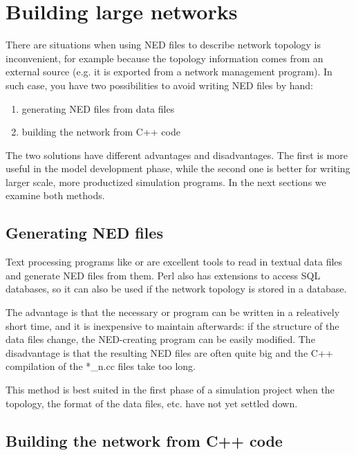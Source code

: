 \section{Building large networks}

There are situations when using NED files to describe network topology
is inconvenient, for example because the topology information comes
from an external source (e.g. it is
exported from a network management program). In such case, you have
two possibilities to avoid writing NED files by hand:
\begin{enumerate}
\item{generating NED files from data files}
\item{building the network from C++ code}
\end{enumerate}

The two solutions have different advantages and disadvantages.
The first is more useful in the model development phase, while
the second one is better for writing larger scale, more productized
simulation programs. In the next sections we examine both methods.




\subsection{Generating NED files}


Text processing programs like  or  are
excellent tools to read in textual data files and generate NED files
from them.  Perl also has extensions to
access SQL databases, so it can also be used if the network topology
is stored in a database.

The advantage is that the necessary  or 
program can be written in a releatively short time, and it is
inexpensive to maintain afterwards: if the structure of the data files
change, the NED-creating program can be easily modified. The
disadvantage is that the resulting NED files are often quite big and
the C++ compilation of the *\_n.cc files take too long.

This method is best suited in the first phase of a simulation
project when the topology, the format of the data files, etc.
have not yet settled down.





\subsection{Building the network from C++ code}

